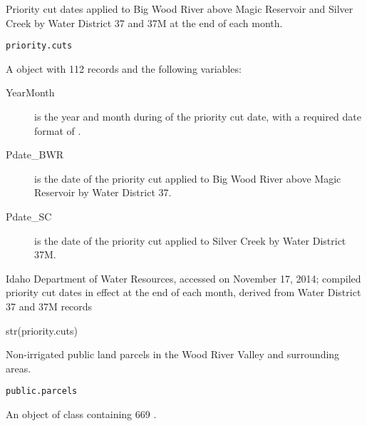 \documentclass[a4paper]{book}
\begin{document}
%
\begin{Description}\relax
Priority cut dates applied to Big Wood River above Magic Reservoir and Silver Creek by Water District 37 and 37M at the end of each month.
\end{Description}
%
\begin{Usage}
\begin{verbatim}
priority.cuts
\end{verbatim}
\end{Usage}
%
\begin{Format}
A  object with 112 records and the following variables:
\begin{description}

\item[YearMonth] is the year and month during of the priority cut date, with a required date format of .
\item[Pdate\_BWR] is the date of the priority cut applied to Big Wood River above Magic Reservoir by Water District 37.
\item[Pdate\_SC] is the date of the priority cut applied to Silver Creek by Water District 37M.

\end{description}

\end{Format}
%
\begin{Source}\relax
Idaho Department of Water Resources, accessed on November 17, 2014;
compiled priority cut dates in effect at the end of each month, derived from Water District 37 and 37M records
\end{Source}
%
\begin{Examples}
\begin{ExampleCode}
str(priority.cuts)
\end{ExampleCode}
\end{Examples}
%
\begin{Description}\relax
Non-irrigated public land parcels in the Wood River Valley and surrounding areas.
\end{Description}
%
\begin{Usage}
\begin{verbatim}
public.parcels
\end{verbatim}
\end{Usage}
%
\begin{Format}
An object of  class containing 669 .
\end{Format}
\end{document}
